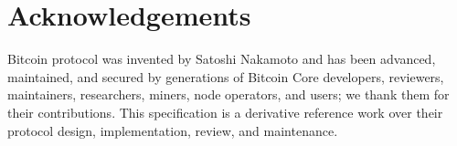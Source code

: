 \section{Acknowledgements}

Bitcoin protocol was invented by Satoshi Nakamoto and has been advanced, maintained, and
secured by generations of Bitcoin Core developers, reviewers, maintainers,
researchers, miners, node operators, and users; we thank them for their contributions. 
This specification is a derivative reference work over their protocol design, implementation, review,
and maintenance.